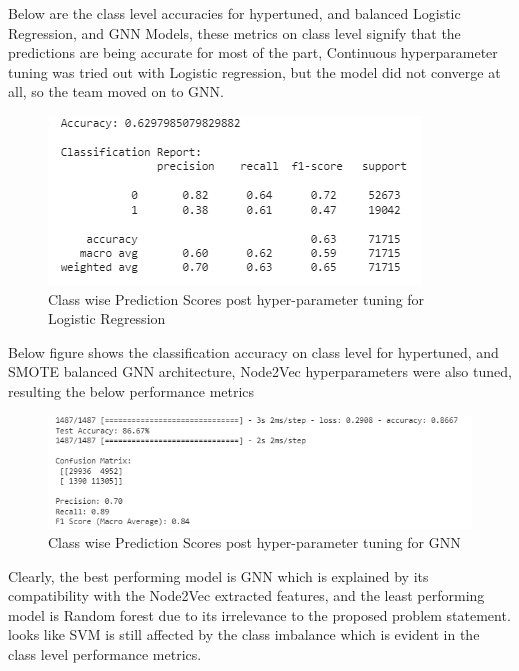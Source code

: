 \documentclass[journal,transmag]{J-NaNA}
\begin{document}
Below are the class level accuracies for hypertuned, and balanced Logistic Regression, and GNN Models, these metrics on class level signify that the predictions are being accurate for most of the part, Continuous hyperparameter tuning was tried out with Logistic regression, but the model did not converge at all, so the team moved on to GNN. 

\begin{figure}[htbp]
\centering
\includegraphics[width=\linewidth]{logistic_regression_post-hyperparmeter.PNG} 
\caption{Class wise Prediction Scores post hyper-parameter tuning for Logistic Regression} 
\label{fig: post-hyper-parameter-tuning} %
\end{figure}

Below figure shows the classification accuracy on class level for hypertuned, and SMOTE balanced GNN architecture, Node2Vec hyperparameters were also tuned, resulting the below performance metrics

\begin{figure}[htbp]
\centering
\includegraphics[width=\linewidth]{gnn-post-hyperparameter.PNG} 
\caption{Class wise Prediction Scores post hyper-parameter tuning for GNN} 
\label{fig: post-hyper-parameter-tuning} %
\end{figure}

Clearly, the best performing model is GNN which is explained by its compatibility with the Node2Vec extracted features, and the least performing model is Random forest due to its irrelevance to the proposed problem statement. looks like SVM is still affected by the class imbalance which is evident in the class level performance metrics. 
\end{document}
